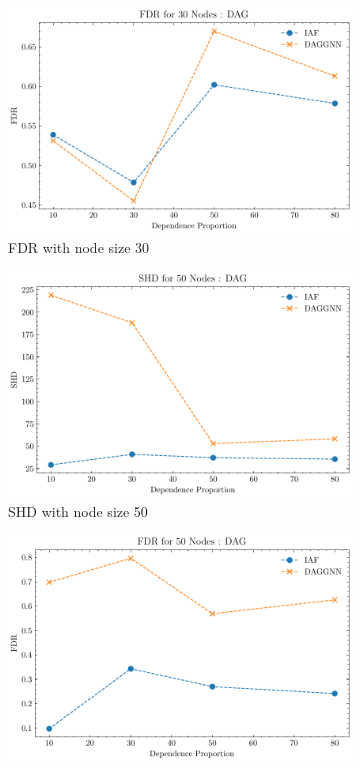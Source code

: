 \documentclass[10pt]{article}
\begin{document}
\begin{figure}[p]
\begin{subfigure}{0.45\textwidth}
        \includegraphics[width=\textwidth]{fig/FDR_dependence_30_DAG_threshold0.3.pdf}
        \caption{FDR with node size 30}
        \label{FDR_node30}
    \end{subfigure}
    \begin{subfigure}{0.45\textwidth}
        \includegraphics[width=\textwidth]{fig/SHD_dependence_50_DAG_threshold0.3.pdf}
        \caption{SHD with node size 50}
        \label{SHD_node50}
    \end{subfigure}
    \hfill
    \begin{subfigure}{0.45\textwidth}
        \includegraphics[width=\textwidth]{fig/FDR_dependence_50_DAG_threshold0.3.pdf}

\end{subfigure}
\end{figure}
\end{document}
